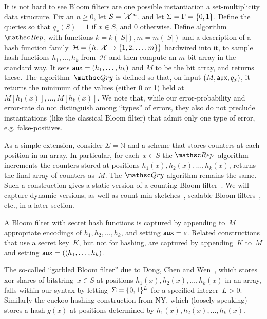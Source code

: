 It is not hard to see Bloom filters are one possible instantiation a set-multiplicity data structure.
Fix an $n \geq 0$, let $\mathcal{S}=[{\cal X}]^n$, and let $\Sigma=\Gamma=\{0,1\}$.  
Define the queries so that $q_x(S)=1$ if $x \in S$, and 0 otherwise.  Define algorithm~$\Rep$, with functions $k=k(|S|), m=m(|S|)$ and a description of a hash function family~$\mathcal{H}=\{h \colon {\cal X} \to \{1,2,\ldots,m\}\}$ hardwired into it, to sample hash functions $h_1, \ldots, h_k$ from~$\mathcal{H}$ and then compute an $m$-bit array in the standard way.  It sets ${\sf aux} = (h_1, \ldots, h_k)$ and $M$ to be the bit array, and returns these.  The algorithm~$\Qry$ is defined so that, on input $(M,{\sf aux},q_x)$, it returns the minimum of the values (either 0 or 1) held at $M[h_1(x)],\ldots,M[h_k(x)]$.  We note that, while our error-probability and error-rate do not distinguish among ``types'' of errors, they also do not preclude instantiations (like the classical Bloom filter) that admit only one type of error, e.g. false-positives.  

As a simple extension, consider $\Sigma=\mathbb{N}$ and a scheme that stores counters at each position in an array.  In particular, for each~$x \in S$ the $\Rep$~algorithm increments the counters stored at positions $h_1(x), h_2(x), \ldots, h_k(x)$, returns the final array of counters as~$M$.  The $\Qry$-algorithm remains the same. Such a construction gives a static version of a counting Bloom filter~\cite{xxx}.  We will capture dynamic versions, as well as count-min sketches~\cite{xxx}, scalable Bloom filters~\cite{xxx}, etc., in a later section.

A Bloom filter with secret hash functions is captured by appending to~$M$ appropriate encodings of $h_1,h_2,\ldots,h_k$, and setting ${\sf aux}=\varepsilon$.  Related constructions  that use a secret key~$K$, but not for hashing, are captured by appending~$K$ to~$M$ and setting ${\sf aux}=((h_1, \ldots, h_k)$.

The so-called ``garbled Bloom filter'' due to Dong, Chen and Wen~\cite{xxx}, which stores xor-shares of bitstring~$x \in S$ at positions $h_1(x),h_2(x),\ldots,h_k(x)$ in an array, falls within our syntax by letting~$\Sigma=\{0,1\}^L$ for a specified integer~$L>0$.  Similarly the cuckoo-hashing construction from NY, which (loosely speaking) stores a hash $g(x)$ at positions determined by $h_1(x),h_2(x),\ldots,h_k(x)$.   


